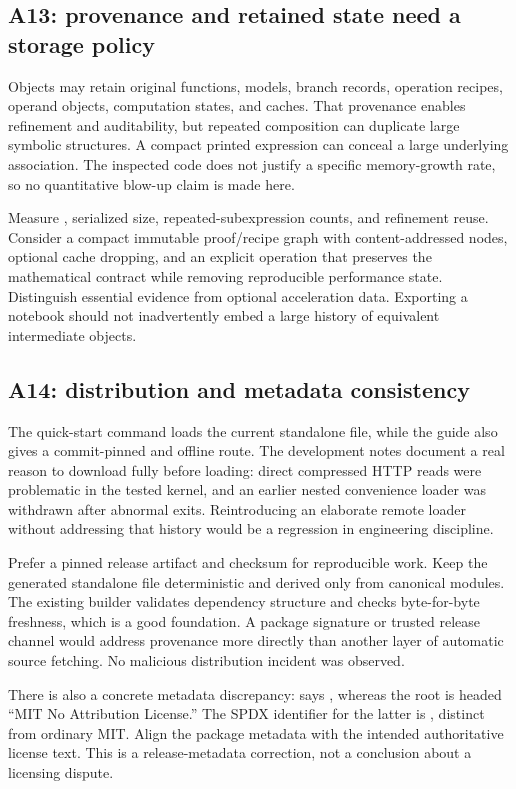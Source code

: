 \subsection{A13: provenance and retained state need a storage policy}
Objects may retain original functions, models, branch records, operation recipes, operand objects, computation states, and caches. That provenance enables refinement and auditability, but repeated composition can duplicate large symbolic structures. A compact printed expression can conceal a large underlying association. The inspected code does not justify a specific memory-growth rate, so no quantitative blow-up claim is made here.\cite{arithmetic,incremental,inverseexpressions,gamma}

Measure , serialized size, repeated-subexpression counts, and refinement reuse. Consider a compact immutable proof/recipe graph with content-addressed nodes, optional cache dropping, and an explicit  operation that preserves the mathematical contract while removing reproducible performance state. Distinguish essential evidence from optional acceleration data. Exporting a notebook should not inadvertently embed a large history of equivalent intermediate objects.

\subsection{A14: distribution and metadata consistency}
The quick-start command loads the current  standalone file, while the guide also gives a commit-pinned and offline route. The development notes document a real reason to download fully before loading: direct compressed HTTP reads were problematic in the tested kernel, and an earlier nested convenience loader was withdrawn after abnormal exits. Reintroducing an elaborate remote loader without addressing that history would be a regression in engineering discipline.\cite{guide,development}

Prefer a pinned release artifact and checksum for reproducible work. Keep the generated standalone file deterministic and derived only from canonical modules. The existing builder validates dependency structure and checks byte-for-byte freshness, which is a good foundation. A package signature or trusted release channel would address provenance more directly than another layer of automatic source fetching. No malicious distribution incident was observed.\cite{development,workflow}

There is also a concrete metadata discrepancy:  says , whereas the root  is headed ``MIT No Attribution License.'' The SPDX identifier for the latter is , distinct from ordinary MIT. Align the package metadata with the intended authoritative license text. This is a release-metadata correction, not a conclusion about a licensing dispute.\cite{paclet,license,spdx}
